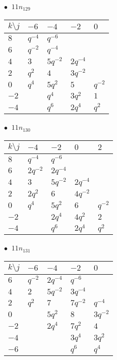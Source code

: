 %
\begin{minipage}{\linewidth}
$\bullet\ $ $11n_{129}$ \vspace{0.5em} \\
\begin{tabular}{l|llll}
$k \setminus j$ & $-6$ & $-4$ & $-2$ & $0$ \\
\hline
$8$ & $q^{-4}$ & $q^{-6}$ &  &  \\
$6$ & $q^{-2}$ & $q^{-4}$ &  &  \\
$4$ & $3$ & $5q^{-2}$ & $2q^{-4}$ &  \\
$2$ & $q^{2}$ & $4$ & $3q^{-2}$ &  \\
$0$ & $q^{4}$ & $5q^{2}$ & $5$ & $q^{-2}$ \\
$-2$ &  & $q^{4}$ & $3q^{2}$ & $1$ \\
$-4$ &  & $q^{6}$ & $2q^{4}$ & $q^{2}$ \\
\end{tabular}
\vspace{2em}
\end{minipage}
%
\begin{minipage}{\linewidth}
$\bullet\ $ $11n_{130}$ \vspace{0.5em} \\
\begin{tabular}{l|llll}
$k \setminus j$ & $-4$ & $-2$ & $0$ & $2$ \\
\hline
$8$ & $q^{-4}$ & $q^{-6}$ &  &  \\
$6$ & $2q^{-2}$ & $2q^{-4}$ &  &  \\
$4$ & $3$ & $5q^{-2}$ & $2q^{-4}$ &  \\
$2$ & $2q^{2}$ & $6$ & $4q^{-2}$ &  \\
$0$ & $q^{4}$ & $5q^{2}$ & $6$ & $q^{-2}$ \\
$-2$ &  & $2q^{4}$ & $4q^{2}$ & $2$ \\
$-4$ &  & $q^{6}$ & $2q^{4}$ & $q^{2}$ \\
\end{tabular}
\vspace{2em}
\end{minipage}
%
\begin{minipage}{\linewidth}
$\bullet\ $ $11n_{131}$ \vspace{0.5em} \\
\begin{tabular}{l|llll}
$k \setminus j$ & $-6$ & $-4$ & $-2$ & $0$ \\
\hline
$6$ & $q^{-2}$ & $2q^{-4}$ & $q^{-6}$ &  \\
$4$ & $2$ & $5q^{-2}$ & $3q^{-4}$ &  \\
$2$ & $q^{2}$ & $7$ & $7q^{-2}$ & $q^{-4}$ \\
$0$ &  & $5q^{2}$ & $8$ & $3q^{-2}$ \\
$-2$ &  & $2q^{4}$ & $7q^{2}$ & $4$ \\
$-4$ &  &  & $3q^{4}$ & $3q^{2}$ \\
$-6$ &  &  & $q^{6}$ & $q^{4}$ \\
\end{tabular}
\vspace{2em}
\end{minipage}
